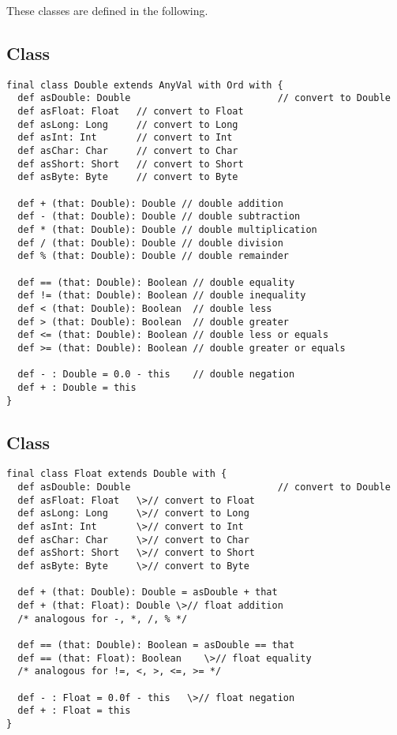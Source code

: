 \documentclass[a4paper,12pt,twoside,titlepage]{book}
\begin{document}
These classes are defined in the following.

\subsection{Class }

\begin{lstlisting}
final class Double extends AnyVal with Ord with {
  def asDouble: Double                          // convert to Double
  def asFloat: Float   // convert to Float
  def asLong: Long     // convert to Long
  def asInt: Int       // convert to Int
  def asChar: Char     // convert to Char
  def asShort: Short   // convert to Short
  def asByte: Byte     // convert to Byte

  def + (that: Double): Double // double addition
  def - (that: Double): Double // double subtraction
  def * (that: Double): Double // double multiplication
  def / (that: Double): Double // double division
  def % (that: Double): Double // double remainder

  def == (that: Double): Boolean // double equality
  def != (that: Double): Boolean // double inequality
  def < (that: Double): Boolean  // double less
  def > (that: Double): Boolean  // double greater
  def <= (that: Double): Boolean // double less or equals
  def >= (that: Double): Boolean // double greater or equals

  def - : Double = 0.0 - this    // double negation
  def + : Double = this
}
\end{lstlisting}

\subsection{Class }

\begin{lstlisting}
final class Float extends Double with {
  def asDouble: Double                          // convert to Double
  def asFloat: Float   \>// convert to Float
  def asLong: Long     \>// convert to Long
  def asInt: Int       \>// convert to Int
  def asChar: Char     \>// convert to Char
  def asShort: Short   \>// convert to Short
  def asByte: Byte     \>// convert to Byte

  def + (that: Double): Double = asDouble + that
  def + (that: Float): Double \>// float addition
  /* analogous for -, *, /, % */

  def == (that: Double): Boolean = asDouble == that
  def == (that: Float): Boolean    \>// float equality
  /* analogous for !=, <, >, <=, >= */

  def - : Float = 0.0f - this   \>// float negation
  def + : Float = this
}
\end{lstlisting}
\end{document}
